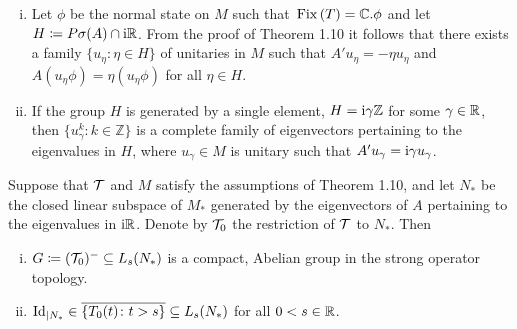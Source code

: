 \begin{remarks}\label{rem:d3-1.12}

\begin{enumerate}[(i), wide]

\item 
Let $\phi$ be the normal state on $M$ such that $\mathop{}\mathrm{Fix}\left(T\right) = \mathbb{C} . \phi$ and let $H \coloneqq P\sigma(A) \cap \mathrm{i}\mathbb{R}$.
From the proof of Theorem 1.10 it follows that there exists a family $\{u_{\eta} \colon \eta \in H\}$ of unitaries in $M$ such that $A'u_{\eta} = -\eta u_{\eta}$ and $A(u_{\eta}\phi) = \eta(u_{\eta}\phi)$ for all $\eta \in H$.

\item 
If the group $H$ is generated by a single element, \ie $H = \mathrm{i}\gamma\mathbb{Z}$ for some $\gamma \in \mathbb{R}$, then 
$\{u_{\gamma}^{k} \colon k \in \mathbb{Z}\}$ 
is a complete family of eigenvectors pertaining to the eigenvalues in $H$, where $u_{\gamma} \in M$ is unitary such that $A'u_{\gamma} = \mathrm{i}\gamma u_{\gamma}$.

\end{enumerate}
\end{remarks}
\begin{proposition}\label{prop:d3-1.13}
Suppose that $\mathcal{T}$ and $M$ satisfy the assumptions of Theorem 1.10, and let $N_{*}$ be the closed linear subspace of $M_{*}$ generated by the eigenvectors of $A$ pertaining to the eigenvalues in $\mathrm{i}\mathbb{R}$.
Denote by $\mathcal{T}_{0}$ the restriction of $\mathcal{T}$ to $N_{*}$.
Then
\begin{enumerate}[(i)]

\item 
$G \coloneqq (\mathcal{T}_{0})^{-} \subseteq L_{s}(N_{*})$ is a compact, Abelian group in the strong operator topology.

\item 
$\operatorname{Id}_{| N_{{*}}} \in \overline{\{T_{0}(t) \colon t>s\}} \subseteq L_{s}(N_{*})$ for all $0<s \in \mathbb{R}$.
\end{enumerate}
\end{proposition}
